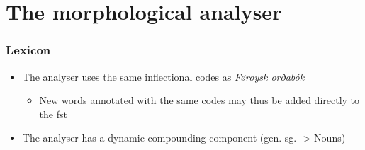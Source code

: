 \documentclass{beamer}
\begin{document}
\section{The morphological analyser}
\begin{frame}
\frametitle{Lexicon}

\begin{itemize}
\item The analyser uses the same inflectional codes as  \textit{Føroysk orðabók} 
\begin{itemize}
\item New words annotated with the same codes may thus be added directly to the fst
\end{itemize}
\item The analyser has a dynamic compounding component (gen. sg. -> Nouns)
\end{itemize}
\end{frame}

\end{document}

